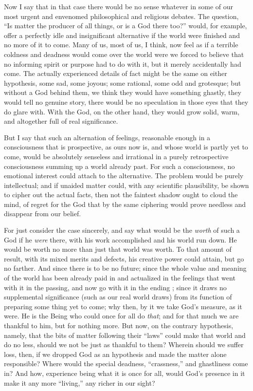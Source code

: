 \documentclass[12pt]{article}
\begin{document}
Now I say that in that case there would be no sense whatever in some of our most urgent and envenomed philosophical and religious debates. The question, ``Is matter the producer of all things, or is a God there too?'' would, for example, offer a perfectly idle and insignificant alternative if the world were finished and no more of it to come. Many of us, most of us, I think, now feel as if a terrible coldness and deadness would come over the world were we forced to believe that no informing spirit or purpose had to do with it, but it merely accidentally had come. The actually experienced details of fact might be the same on either hypothesis, some sad, some joyous; some rational, some odd and grotesque; but without a God behind them, we think they would have something ghastly, they would tell no genuine story, there would be no speculation in those eyes that they do glare with. With the God, on the other hand, they would grow solid, warm, and altogether full of real significance. 

But I say that such an alternation of feelings, reasonable enough in a consciousness that is prospective, as ours now is, and whose world is partly yet to come, would be absolutely senseless and irrational in a purely retrospective consciousness summing up a world already past. For such a consciousness, no emotional interest could attach to the alternative. The problem would be purely intellectual; and if unaided matter could, with any scientific plausibility, be shown to cipher out the actual facts, then not the faintest shadow ought to cloud the mind, of regret for the God that by the same ciphering would prove needless and disappear from our belief. 

For just consider the case sincerely, and say what would be the \emph{worth} of such a God if he \emph{were} there, with his work accomplished and his world run down. He would be worth no more than just that world was worth. To that amount of result, with its mixed merits and defects, his creative power could attain, but go no farther. And since there is to be no future; since the whole value and meaning of the world has been already paid in and actualized in the feelings that went with it in the passing, and now go with it in the ending ; since it draws no supplemental significance (such as our real world draws) from its function of preparing some thing yet to come; why then, by it we take God's measure, as it were. He is the Being who could once for all do \emph{that}; and for that much we are thankful to him, but for nothing more. But now, on the contrary hypothesis, namely, that the bits of matter following their ``laws'' could make that world and do no less, should we not be just as thankful to them? Wherein should we suffer loss, then, if we dropped God as an hypothesis and made the matter alone responsible? Where would the special deadness, ``crassness,'' and ghastliness come in? And how, experience being what it is once for all, would God's presence in it make it any more ``living,'' any richer in our sight? 
\end{document}
